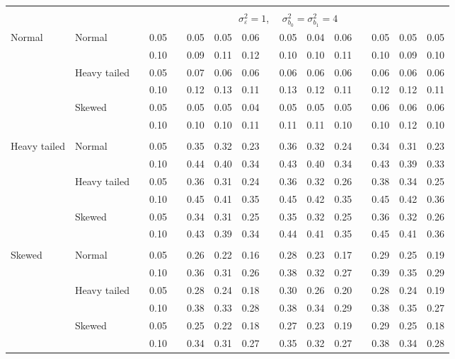 \documentclass[12pt]{article} %
\begin{document}
\begin{table}[ht]
\begin{scriptsize}
\begin{center}
\begin{tabular}{ll p{.1cm} c p{.1cm} rrr p{.1cm} rrr p{.1cm} rrr}
&&&&&&&&&&&&&&&\\
& && && \multicolumn{9}{c}{$\sigma_{\varepsilon}^2 = 1$, \ \ $\sigma_{b_0}^2 = \sigma_{b_1}^2 = 4$} \\ \cline{6-16}
\rowcolor{gray!20}Normal       & Normal       && 0.05 &&   0.05 & 0.05 & 0.06 && 0.05 & 0.04 & 0.06 && 0.05 & 0.05 & 0.05 \\
\rowcolor{gray!20}             &              && 0.10 &&   0.09 & 0.11 & 0.12 && 0.10 & 0.10 & 0.11 && 0.10 & 0.09 & 0.10 \\
\rowcolor{gray!20}             & Heavy tailed && 0.05 &&   0.07 & 0.06 & 0.06 && 0.06 & 0.06 & 0.06 && 0.06 & 0.06 & 0.06 \\
\rowcolor{gray!20}             &              && 0.10 &&   0.12 & 0.13 & 0.11 && 0.13 & 0.12 & 0.11 && 0.12 & 0.12 & 0.11 \\
\rowcolor{gray!20}             & Skewed       && 0.05 &&   0.05 & 0.05 & 0.04 && 0.05 & 0.05 & 0.05 && 0.06 & 0.06 & 0.06 \\
\rowcolor{gray!20}             &              && 0.10 &&   0.10 & 0.10 & 0.11 && 0.11 & 0.11 & 0.10 && 0.10 & 0.12 & 0.10 \\
             &&&&&&&&&&&&&&&\\
Heavy tailed & Normal       && 0.05 &&   0.35 & 0.32 & 0.23 && 0.36 & 0.32 & 0.24 &&  0.34 & 0.31 & 0.23 \\
             &              && 0.10 &&   0.44 & 0.40 & 0.34 && 0.43 & 0.40 & 0.34 &&  0.43 & 0.39 & 0.33 \\
             & Heavy tailed && 0.05 &&   0.36 & 0.31 & 0.24 && 0.36 & 0.32 & 0.26 &&  0.38 & 0.34 & 0.25 \\
             &              && 0.10 &&   0.45 & 0.41 & 0.35 && 0.45 & 0.42 & 0.35 &&  0.45 & 0.42 & 0.36 \\
             & Skewed       && 0.05 &&   0.34 & 0.31 & 0.25 && 0.35 & 0.32 & 0.25 &&  0.36 & 0.32 & 0.26 \\
             &              && 0.10 &&   0.43 & 0.39 & 0.34 && 0.44 & 0.41 & 0.35 &&  0.45 & 0.41 & 0.36 \\
             &&&&&&&&&&&&&&&\\
Skewed       & Normal       && 0.05 &&   0.26 & 0.22 & 0.16 && 0.28 & 0.23 & 0.17 && 0.29 & 0.25 & 0.19 \\
             &              && 0.10 &&   0.36 & 0.31 & 0.26 && 0.38 & 0.32 & 0.27 && 0.39 & 0.35 & 0.29 \\
             & Heavy tailed && 0.05 &&   0.28 & 0.24 & 0.18 && 0.30 & 0.26 & 0.20 && 0.28 & 0.24 & 0.19 \\
             &              && 0.10 &&   0.38 & 0.33 & 0.28 && 0.38 & 0.34 & 0.29 && 0.38 & 0.35 & 0.27 \\
             & Skewed       && 0.05 &&   0.25 & 0.22 & 0.18 && 0.27 & 0.23 & 0.19 && 0.29 & 0.25 & 0.18 \\
             &              && 0.10 &&   0.34 & 0.31 & 0.27 && 0.35 & 0.32 & 0.27 && 0.38 & 0.34 & 0.28 \\



\end{tabular}
\end{center}
\end{scriptsize}
\end{table}
\end{document}
